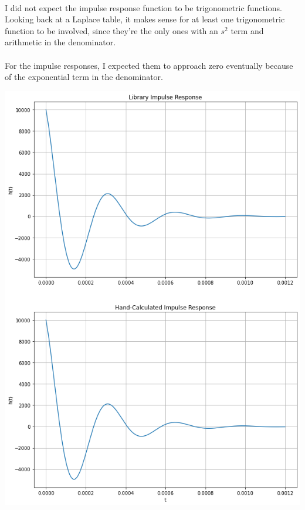 \documentclass[12pt]{report}
\begin{document}
    \paragraph{} I did not expect the impulse response function to be trigonometric functions. Looking back at a Laplace table, it makes sense for at least one trigonometric function to be involved, since they're the only ones with an $s^{2}$ term and arithmetic in the denominator. 
    
    \paragraph{} For the impulse responses, I expected them to approach zero eventually because of the exponential term in the denominator. 
    
    \includegraphics[scale=0.6]{impulse response.png}
    
\end{document}
